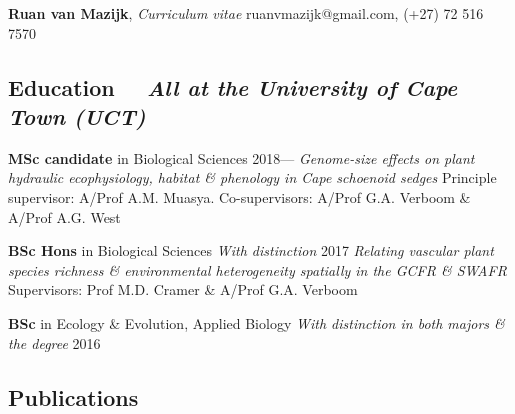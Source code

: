 \documentclass[10pt]{article}
\begin{document}
{\Large
\textbf{Ruan van Mazijk}, \textit{Curriculum vitae} \hfill
  ruanvmazijk@gmail.com, (+27) 72 516 7570
}

\hrulefill

\subsection*{Education %
  ~~{\footnotesize \textmd{\textit{All at the University of Cape Town (UCT)}}}}

\begin{hangparas}{2em}{1}

\textbf{MSc candidate} in Biological Sciences              \hfill 2018--- \break
\textit{Genome-size effects on plant hydraulic ecophysiology, habitat \&
  phenology in Cape schoenoid sedges} \break
Principle supervisor: A/Prof A.M. Muasya. Co-supervisors: A/Prof G.A. Verboom
  \& A/Prof A.G. West

\textbf{BSc Hons} in Biological Sciences {\footnotesize \textit{With distinction
  }}                                                          \hfill 2017 \break
\textit{Relating vascular plant species richness \& environmental heterogeneity
  spatially in the GCFR \& SWAFR} \break
Supervisors: Prof M.D. Cramer \& A/Prof G.A. Verboom

\textbf{BSc} in Ecology \& Evolution, Applied Biology {\footnotesize \textit{
  With distinction in both majors \& the degree}}             \hfill 2016 \break
\hfill

\end{hangparas}

\subsection*{Publications} %

\begin{hangparas}{2em}{1}

\hrulefill
\end{hangparas}
\end{document}
